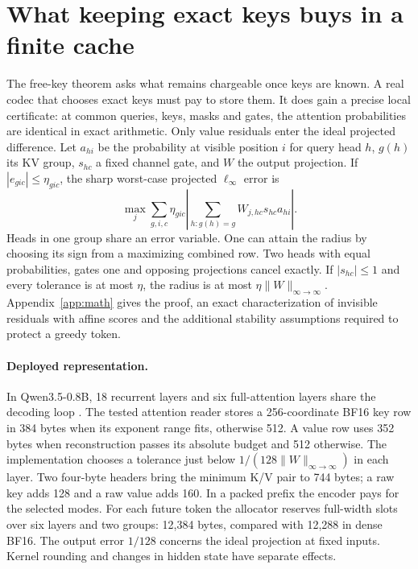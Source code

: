 \section{What keeping exact keys buys in a finite cache}\label{sec:kv}
The free-key theorem asks what remains chargeable once keys are known. A real codec that chooses exact keys must pay to store them. It does gain a precise local certificate: at common queries, keys, masks and gates, the attention probabilities are identical in exact arithmetic. Only value residuals enter the ideal projected difference. Let $a_{hi}$ be the probability at visible position $i$ for query head $h$, $g(h)$ its KV group, $s_{hc}$ a fixed channel gate, and $W$ the output projection. If $|e_{gic}|\le\eta_{gic}$, the sharp worst-case projected $\ell_\infty$ error is
\begin{equation}
 \max_j\sum_{g,i,c}\eta_{gic}\left|\sum_{h:g(h)=g} W_{j,hc}s_{hc} a_{hi}\right| .
 \label{eq:localbody}
\end{equation}
Heads in one group share an error variable. One can attain the radius by choosing its sign from a maximizing combined row. Two heads with equal probabilities, gates one and opposing projections cancel exactly. If $|s_{hc}|\le1$ and every tolerance is at most $\eta$, the radius is at most $\eta\|W\|_{\infty\to\infty}$. Appendix~\ref{app:math} gives the proof, an exact characterization of invisible residuals with affine scores and the additional stability assumptions required to protect a greedy token.

\paragraph{Deployed representation.}
In Qwen3.5-0.8B, 18 recurrent layers and six full-attention layers share the decoding loop \cite{qwen,gdn}. The tested attention reader stores a 256-coordinate BF16 key row in 384 bytes when its exponent range fits, otherwise 512. A value row uses 352 bytes when reconstruction passes its absolute budget and 512 otherwise. The implementation chooses a tolerance just below $1/(128\|W\|_{\infty\to\infty})$ in each layer. Two four-byte headers bring the minimum K/V pair to 744 bytes; a raw key adds 128 and a raw value adds 160. In a packed prefix the encoder pays for the selected modes. For each future token the allocator reserves full-width slots over six layers and two groups: 12,384 bytes, compared with 12,288 in dense BF16. The output error $1/128$ concerns the ideal projection at fixed inputs. Kernel rounding and changes in hidden state have separate effects.

